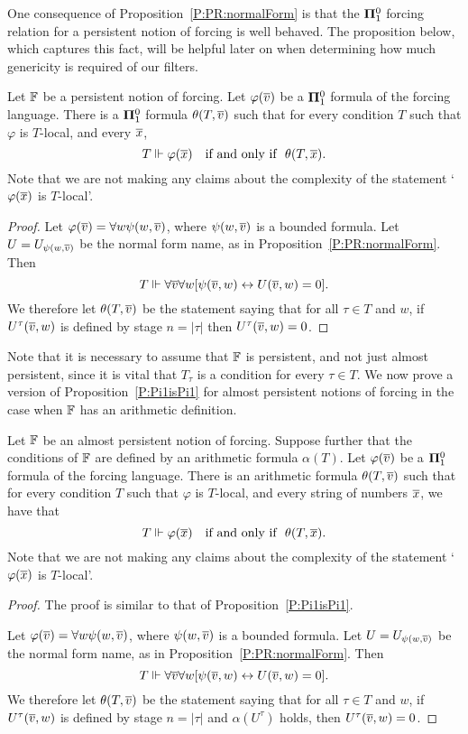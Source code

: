 One consequence of Proposition~\ref{P:PR:normalForm} is that the $\mathbf{\Pi}^0_1$
forcing relation for a persistent notion of forcing is well behaved.
The proposition below, which captures this fact,
will be helpful later on when determining how much genericity is required
of our filters.

\begin{prop}\label{P:Pi1isPi1}
Let $\mathbb{F}$ be a persistent notion of forcing.
Let $\varphi(\overline{v})$ be a $\mathbf{\Pi}^0_1$ formula of the forcing language.
There is a $\mathbf{\Pi}^0_1$ formula $\theta(T,\overline{v})$ such that
for every condition $T$ such that $\varphi$ is $T$-local,
and every $\overline{x}$,
$$T\Vdash\varphi(\tup{x})\ \ \ \text{if and only if}\ \ \theta(T,\tup{x}).$$
Note that we are not making any claims about the complexity of
the statement `$\varphi(\overline{x})$ is $T$-local'.
\end{prop}
\begin{proof}
Let $\varphi(\overline{v})=\forall w\psi(w,\overline{v})$,
where $\psi(w,\overline{v})$ is a bounded formula.
Let $U=U_{\psi(w,\overline{v})}$ be the normal form name, as in Proposition~\ref{P:PR:normalForm}.
Then
$$T\Vdash \forall\overline{v}\forall w[\psi(\overline{v},w)\leftrightarrow U(\overline{v},w)=0].$$
We therefore let $\theta(T,\overline{v})$ be the statement saying that for all
$\tau\in T$ and $w$, if $U^\tau(\overline{v},w)$ is defined by stage
$n=|\tau|$ then $U^\tau(\overline{v},w)=0$.
\end{proof}

Note that it is necessary to assume that $\mathbb{F}$ is persistent,
and not just almost persistent, since it is vital that $T_\tau$
is a condition for every $\tau\in T$.
We now prove a version of Proposition~\ref{P:Pi1isPi1}
for almost persistent notions of forcing in the case when
$\mathbb{F}$ has an arithmetic definition.

\begin{prop}\label{P:Pi1isArith}
Let $\mathbb{F}$ be an almost persistent notion of forcing.
Suppose further that the conditions of $\mathbb{F}$ are defined
by an arithmetic formula $\alpha(T)$.
Let $\varphi(\overline{v})$ be a $\mathbf{\Pi}^0_1$ formula of the forcing language.
There is an arithmetic formula $\theta(T,\overline{v})$ such that
for every condition $T$ such that $\varphi$ is $T$-local,
and every string of numbers $\overline{x}$, we have that
$$T\Vdash\varphi(\tup{x})\ \ \ \text{if and only if}\ \ \theta(T,\tup{x}).$$
Note that we are not making any claims about the complexity of
the statement `$\varphi(\overline{x})$ is $T$-local'.
\end{prop}
\begin{proof}
The proof is similar to that of Proposition~\ref{P:Pi1isPi1}.

Let $\varphi(\overline{v})=\forall w\psi(w,\overline{v})$,
where $\psi(w,\overline{v})$ is a bounded formula.
Let $U=U_{\psi(w,\overline{v})}$ be the normal form name, as in Proposition~\ref{P:PR:normalForm}.
Then
$$T\Vdash \forall\overline{v}\forall w[\psi(\overline{v},w)\leftrightarrow U(\overline{v},w)=0].$$
We therefore let $\theta(T,\overline{v})$ be the statement saying that for all
$\tau\in T$ and $w$, if $U^\tau(\overline{v},w)$ is defined by stage
$n=|\tau|$ and $\alpha(U^\tau)$ holds, then $U^\tau(\overline{v},w)=0$.
\end{proof}

